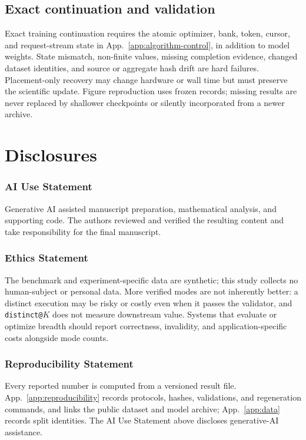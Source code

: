 \documentclass{article}
\newcommand{\1}{\mathbf 1}
\theoremstyle{remark}
\theoremstyle{definition}
\theoremstyle{plain}
\begin{document}
\subsection{Exact continuation and validation}
\label{app:repro-recovery}

Exact training continuation requires the atomic optimizer, bank, token,
cursor, and request-stream state in App.~\ref{app:algorithm-control},
in addition to model weights. State mismatch, non-finite values, missing
completion evidence, changed dataset identities, and source or aggregate
hash drift are hard failures. Placement-only recovery may change hardware
or wall time but must preserve the scientific update. Figure reproduction
uses frozen records; missing results are never replaced by shallower
checkpoints or silently incorporated from a newer archive.

\section{Disclosures}
\label{app:disclosures}

\subsubsection*{AI Use Statement}
\label{sec:ai-use}

Generative AI assisted manuscript preparation, mathematical analysis, and
supporting code. The authors reviewed and verified the resulting content and
take responsibility for the final manuscript.

\subsubsection*{Ethics Statement}

The benchmark and experiment-specific data are synthetic; this study collects
no human-subject or personal data. More verified modes are not inherently
better: a distinct execution may be risky or costly even when it passes the
validator, and \texttt{distinct@}$K$ does not measure downstream value. Systems
that evaluate or optimize breadth should report correctness, invalidity, and
application-specific costs alongside mode counts.

\subsubsection*{Reproducibility Statement}

Every reported number is computed from a versioned result file.
App.~\ref{app:reproducibility} records protocols, hashes, validations,
and regeneration commands, and links the public dataset and model archive;
App.~\ref{app:data} records split identities.
The AI Use Statement above discloses generative-AI assistance.
\end{document}

